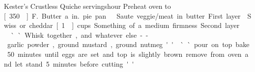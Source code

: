 \begin{recipe}{Kester's Crustless Quiche}
{\unit[6]{servings}}{\unit[1]{hour}}
\freeform Preheat oven to \unit[350\0]{F.} Butter a \unit[9]{in.} pie pan.
Saute veggie/meat in butter. First layer.
Swiss or cheddar. \unit[1]{cups}. Something of a medium firmness. Second layer.

``Whisk together, ... and whatever else--garlic powder, ground mustard,
ground nutmeg...''

\freeform ``... pour on top.  bake 50 minutes until eggs are set and top is
slightly brown.  remove from oven and let stand 5 minutes before
cutting.''
\end{recipe}
